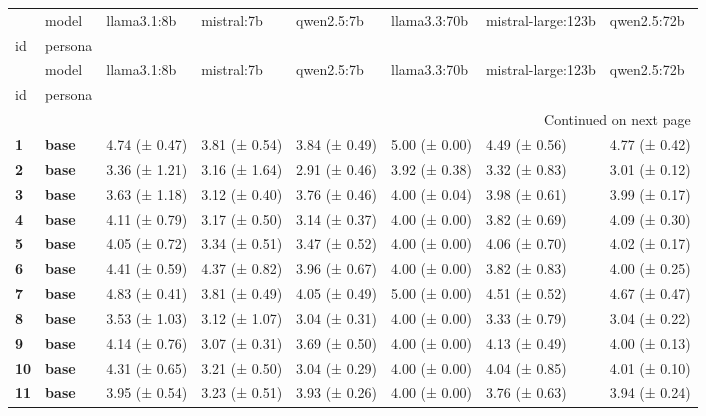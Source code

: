 \begin{longtable}{llllllll}
\toprule
 & model & llama3.1:8b & mistral:7b & qwen2.5:7b & llama3.3:70b & mistral-large:123b & qwen2.5:72b \\
id & persona &  &  &  &  &  &  \\
\midrule
\endfirsthead
\toprule
 & model & llama3.1:8b & mistral:7b & qwen2.5:7b & llama3.3:70b & mistral-large:123b & qwen2.5:72b \\
id & persona &  &  &  &  &  &  \\
\midrule
\endhead
\midrule
\multicolumn{8}{r}{Continued on next page} \\
\midrule
\endfoot
\bottomrule
\endlastfoot
\textbf{1} & \textbf{base} & 4.74 (± 0.47) & 3.81 (± 0.54) & 3.84 (± 0.49) & 5.00 (± 0.00) & 4.49 (± 0.56) & 4.77 (± 0.42) \\
\cline{1-8}
\textbf{2} & \textbf{base} & 3.36 (± 1.21) & 3.16 (± 1.64) & 2.91 (± 0.46) & 3.92 (± 0.38) & 3.32 (± 0.83) & 3.01 (± 0.12) \\
\cline{1-8}
\textbf{3} & \textbf{base} & 3.63 (± 1.18) & 3.12 (± 0.40) & 3.76 (± 0.46) & 4.00 (± 0.04) & 3.98 (± 0.61) & 3.99 (± 0.17) \\
\cline{1-8}
\textbf{4} & \textbf{base} & 4.11 (± 0.79) & 3.17 (± 0.50) & 3.14 (± 0.37) & 4.00 (± 0.00) & 3.82 (± 0.69) & 4.09 (± 0.30) \\
\cline{1-8}
\textbf{5} & \textbf{base} & 4.05 (± 0.72) & 3.34 (± 0.51) & 3.47 (± 0.52) & 4.00 (± 0.00) & 4.06 (± 0.70) & 4.02 (± 0.17) \\
\cline{1-8}
\textbf{6} & \textbf{base} & 4.41 (± 0.59) & 4.37 (± 0.82) & 3.96 (± 0.67) & 4.00 (± 0.00) & 3.82 (± 0.83) & 4.00 (± 0.25) \\
\cline{1-8}
\textbf{7} & \textbf{base} & 4.83 (± 0.41) & 3.81 (± 0.49) & 4.05 (± 0.49) & 5.00 (± 0.00) & 4.51 (± 0.52) & 4.67 (± 0.47) \\
\cline{1-8}
\textbf{8} & \textbf{base} & 3.53 (± 1.03) & 3.12 (± 1.07) & 3.04 (± 0.31) & 4.00 (± 0.00) & 3.33 (± 0.79) & 3.04 (± 0.22) \\
\cline{1-8}
\textbf{9} & \textbf{base} & 4.14 (± 0.76) & 3.07 (± 0.31) & 3.69 (± 0.50) & 4.00 (± 0.00) & 4.13 (± 0.49) & 4.00 (± 0.13) \\
\cline{1-8}
\textbf{10} & \textbf{base} & 4.31 (± 0.65) & 3.21 (± 0.50) & 3.04 (± 0.29) & 4.00 (± 0.00) & 4.04 (± 0.85) & 4.01 (± 0.10) \\
\cline{1-8}
\textbf{11} & \textbf{base} & 3.95 (± 0.54) & 3.23 (± 0.51) & 3.93 (± 0.26) & 4.00 (± 0.00) & 3.76 (± 0.63) & 3.94 (± 0.24) \\

\end{longtable}
